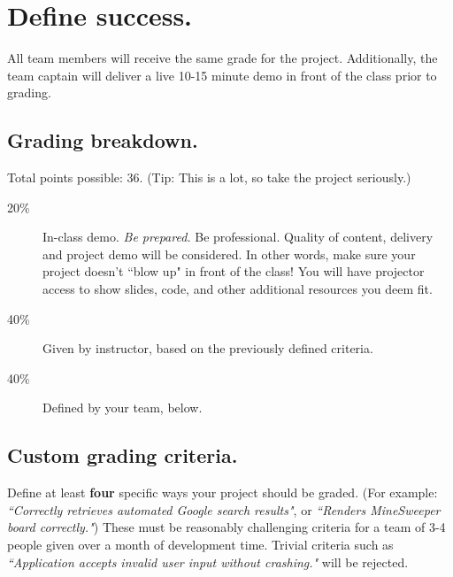 \documentclass[11pt]{article}
\begin{document}
\pagebreak

\section{Define success.}
All team members will receive the same grade for the project. Additionally, the team captain will deliver a live 10-15 minute demo in front of the class prior to grading.

\subsection{Grading breakdown.}

Total points possible: 36. (Tip: This is a lot, so take the project seriously.)

\begin{description}
\item[20\%] In-class demo. {\it Be prepared.} Be professional. Quality of content, delivery and project demo will be considered. In other words, make sure your project doesn't ``blow up" in front of the class! You will have projector access to show slides, code, and other additional resources you deem fit. 
\item[40\%] Given by instructor, based on the previously defined criteria.
\item[40\%] Defined by your team, below.
\end{description}

\subsection{Custom grading criteria.}

Define at least {\bf four} specific ways your project should be graded. (For example: {\it ``Correctly retrieves automated Google search results"}, or {\it ``Renders MineSweeper board correctly."}) These must be reasonably challenging criteria for a team of 3-4 people given over a month of development time. Trivial criteria such as {\it ``Application accepts invalid user input without crashing."} will be rejected.

\underline{\phantom{\hspace{5in}}}

\underline{\phantom{\hspace{5in}}}

\underline{\phantom{\hspace{5in}}}

\underline{\phantom{\hspace{5in}}}
\end{document}
